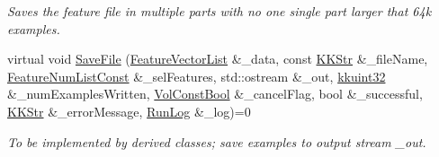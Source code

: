 \begin{DoxyCompactItemize}
\begin{DoxyCompactList}\small\item\em Saves the feature file in multiple parts with no one single part larger that 64k examples. \end{DoxyCompactList}\item 
virtual void \hyperlink{class_k_k_m_l_l_1_1_feature_file_i_o_a7cf4a67f6dd6985f5c052dc40ffd0ec0}{Save\+File} (\hyperlink{class_k_k_m_l_l_1_1_feature_vector_list}{Feature\+Vector\+List} \&\+\_\+data, const \hyperlink{class_k_k_b_1_1_k_k_str}{K\+K\+Str} \&\+\_\+file\+Name, \hyperlink{namespace_k_k_m_l_l_ad276a9ed309552a63300bce930bdfebd}{Feature\+Num\+List\+Const} \&\+\_\+sel\+Features, std\+::ostream \&\+\_\+out, \hyperlink{namespace_k_k_b_af8d832f05c54994a1cce25bd5743e19a}{kkuint32} \&\+\_\+num\+Examples\+Written, \hyperlink{namespace_k_k_b_a7d390f568e2831fb76b86b56c87bf92f}{Vol\+Const\+Bool} \&\+\_\+cancel\+Flag, bool \&\+\_\+successful, \hyperlink{class_k_k_b_1_1_k_k_str}{K\+K\+Str} \&\+\_\+error\+Message, \hyperlink{class_k_k_b_1_1_run_log}{Run\+Log} \&\+\_\+log)=0
\begin{DoxyCompactList}\small\item\em To be implemented by derived classes; save examples to output stream \textquotesingle{}\+\_\+out\textquotesingle{}. \end{DoxyCompactList}\end{DoxyCompactItemize}
